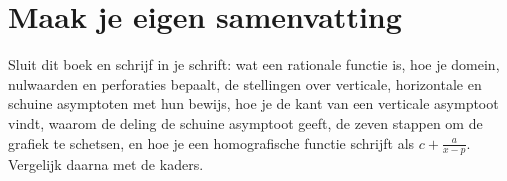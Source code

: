 
\begin{oefeningen}


\end{oefeningen}


\begin{oefeningen}





\end{oefeningen}


\ifzelfstudie
\section*{Maak je eigen samenvatting}
Sluit dit boek en schrijf in je schrift: wat een rationale functie is, hoe je domein, nulwaarden en perforaties bepaalt, de stellingen over verticale, horizontale en schuine asymptoten met hun bewijs, hoe je de kant van een verticale asymptoot vindt, waarom de deling de schuine asymptoot geeft, de zeven stappen om de grafiek te schetsen, en hoe je een homografische functie schrijft als $c + \frac{a}{x - p}$. Vergelijk daarna met de kaders.
\fi
